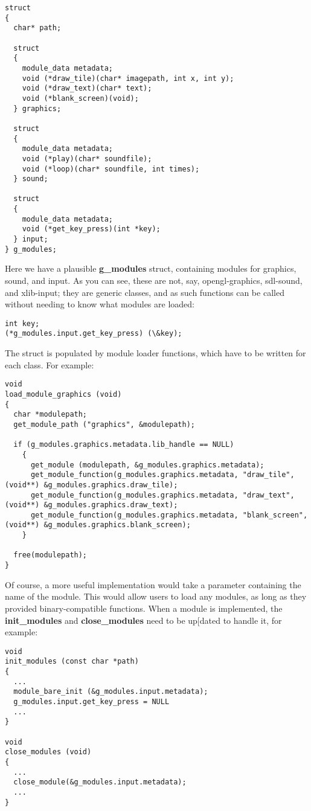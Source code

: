\documentclass[12pt,a4paper]{article}
\begin{document}
\begin{lstlisting}
struct
{
  char* path;

  struct
  {
    module_data metadata;
    void (*draw_tile)(char* imagepath, int x, int y);
    void (*draw_text)(char* text);
    void (*blank_screen)(void);
  } graphics;

  struct
  {
    module_data metadata;
    void (*play)(char* soundfile);
    void (*loop)(char* soundfile, int times);
  } sound;

  struct
  {
    module_data metadata;
    void (*get_key_press)(int *key);
  } input;
} g_modules;
\end{lstlisting}

Here we have a plausible \textbf{g\_modules} struct, containing modules for graphics, sound, and input. As you can see, these are not, say, opengl-graphics, sdl-sound, and xlib-input; they are generic classes, and as such functions can be called without needing to know what modules are loaded:

\begin{lstlisting}
int key;
(*g_modules.input.get_key_press) (\&key);
\end{lstlisting}

The struct is populated by module loader functions, which have to be written for each class. For example:

\begin{lstlisting}
void
load_module_graphics (void)
{
  char *modulepath;
  get_module_path ("graphics", &modulepath);

  if (g_modules.graphics.metadata.lib_handle == NULL)
    {
      get_module (modulepath, &g_modules.graphics.metadata);
      get_module_function(g_modules.graphics.metadata, "draw_tile", (void**) &g_modules.graphics.draw_tile);
      get_module_function(g_modules.graphics.metadata, "draw_text", (void**) &g_modules.graphics.draw_text);
      get_module_function(g_modules.graphics.metadata, "blank_screen", (void**) &g_modules.graphics.blank_screen);
    }

  free(modulepath);
}
\end{lstlisting}

Of course, a more useful implementation would take a parameter containing the name of the module. This would allow users to load any modules, as long as they provided binary-compatible functions. When a module is implemented, the \textbf{init\_modules} and \textbf{close\_modules} need to be up[dated to handle it, for example:

\begin{lstlisting}
void
init_modules (const char *path)
{
  ...
  module_bare_init (&g_modules.input.metadata);
  g_modules.input.get_key_press = NULL
  ...
}

void
close_modules (void)
{
  ...
  close_module(&g_modules.input.metadata);
  ...
}
\end{lstlisting}
\end{document}
